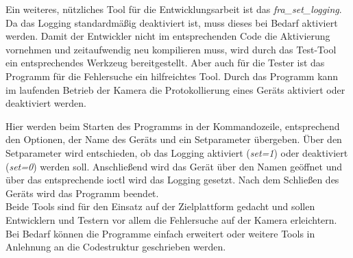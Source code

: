 Ein weiteres, nützliches Tool für die Entwicklungsarbeit ist das \textit{fra\_set\_logging}. Da das Logging standardmäßig deaktiviert ist, muss dieses bei Bedarf aktiviert werden. Damit der Entwickler nicht im entsprechenden Code die Aktivierung vornehmen und zeitaufwendig neu kompilieren muss, wird durch das Test-Tool ein entsprechendes Werkzeug bereitgestellt. Aber auch für die Tester ist das Programm für die Fehlersuche ein hilfreichtes Tool. Durch das Programm kann im laufenden Betrieb der Kamera die Protokollierung eines Geräts aktiviert oder deaktiviert werden.


Hier werden beim Starten des Programms in der Kommandozeile, entsprechend den Optionen, der Name des Geräts und ein Setparameter übergeben. 
Über den Setparameter wird entschieden, ob das Logging aktiviert (\textit{set=1}) oder deaktiviert (\textit{set=0}) werden soll. Anschließend wird das Gerät über den Namen geöffnet und über das entsprechende \ac{ioctl} wird das Logging gesetzt. Nach dem Schließen des Geräts wird das Programm beendet. \\


Beide Tools sind für den Einsatz auf der Zielplattform gedacht und sollen Entwicklern und Testern vor allem die Fehlersuche auf der Kamera erleichtern. Bei Bedarf können die Programme einfach erweitert oder weitere Tools in Anlehnung an die Codestruktur geschrieben werden. 